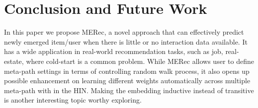 \section{Conclusion and Future Work}
In this paper we propose MERec, a novel approach that can effectively predict newly emerged item/user when there is little or no interaction data available. It has a wide application in real-world recommendation tasks, such as job, real-estate, where cold-start is a common problem. 
While MERec allows user to define meta-path settings in terms of controlling random walk process, it also opens up possible enhancement on learning different weights automatically across multiple meta-path with in the HIN. Making the embedding inductive \cite{hamilton2017inductive} instead of transitive is another interesting topic worthy exploring.